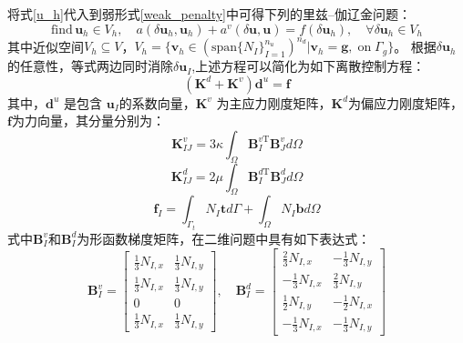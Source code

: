 将式\eqref{u_h}代入到弱形式\eqref{weak_penalty}中可得下列的里兹--伽辽金问题：
\begin{equation}\label{ritz_penalty}
    \text{find}\, \boldsymbol u_h \in V_h, \quad
    a(\delta \boldsymbol u_h, \boldsymbol u_h) + a^v(\delta \boldsymbol u, \boldsymbol u) =
    f(\delta \boldsymbol u_h),
    \quad \forall \delta \boldsymbol u_h \in V_h
\end{equation}
其中近似空间$V_h \subseteq V$，$V_h = \{\boldsymbol v_h \in (\mathrm{span}\{N_I\}_{I=1}^{n_u})^{n_d} \vert \boldsymbol v_h = \boldsymbol g,\; \mathrm{on} \; \Gamma_g\}$。
根据$\delta \boldsymbol u_h$的任意性，等式两边同时消除$\delta \boldsymbol u_I$,上述方程可以简化为如下离散控制方程：
\begin{equation}\label{equilibrium_penalty}
    (\boldsymbol K^d +\boldsymbol K^v) \boldsymbol d^u = \boldsymbol f
\end{equation}
其中，$\boldsymbol d^u$ 是包含 $\boldsymbol u_I$的系数向量，$\boldsymbol K^v$ 为主应力刚度矩阵，$\boldsymbol K^d$为偏应力刚度矩阵，$\boldsymbol f$为力向量，其分量分别为：
\begin{equation}\label{stiffness_vol}
    \boldsymbol K^v_{IJ}=  3\kappa\int_{\Omega} \boldsymbol B^{v\mathrm T}_I \boldsymbol B^v_J d\Omega
\end{equation}
\begin{equation}\label{stiffness_dev}
    \boldsymbol K^d_{IJ}= 2\mu\int_{\Omega} \boldsymbol B^{d\mathrm T}_I \boldsymbol B^d_J d\Omega
\end{equation}
\begin{equation}
    \boldsymbol f_I = \int_{\Gamma_t} N_I \boldsymbol t d\Gamma + \int_{\Omega} N_I \boldsymbol b d\Omega
\end{equation}
式中$\boldsymbol B^v_I$和$\boldsymbol B^d_I$为形函数梯度矩阵，在二维问题中具有如下表达式：
\begin{equation}
    \boldsymbol{B}^v_I= \left[\begin{matrix}
        \frac{1}{3}N_{I,x}&\frac{1}{3}N_{I,y}\\
        \frac{1}{3}N_{I,x}&\frac{1}{3}N_{I,y}\\
        0&0\\
        \frac{1}{3}N_{I,x}&\frac{1}{3}N_{I,y}
    \end{matrix}\right] ,\quad
    \boldsymbol{B}^d_I= \left[\begin{matrix}
        \frac{2}{3}N_{I,x}&-\frac{1}{3}N_{I,y}\\
        -\frac{1}{3}N_{I,x}&\frac{2}{3}N_{I,y}\\
        \frac{1}{2}N_{I,y}&-\frac{1}{2}N_{I,x}\\
        -\frac{1}{3}N_{I,x}&-\frac{1}{3}N_{I,y}
    \end{matrix}\right]
\end{equation}

